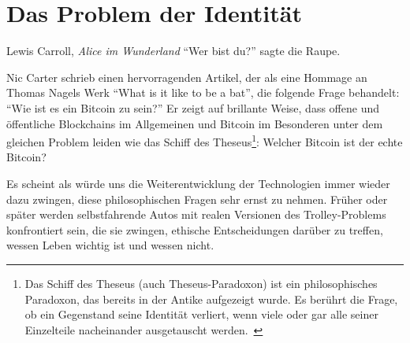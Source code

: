 \chapter{Das Problem der Identität}
\label{les:4}

\begin{chapquote}{Lewis Carroll, \textit{Alice im Wunderland}}
  \enquote{Wer bist du?} sagte die Raupe.
\end{chapquote}

Nic Carter schrieb einen hervorragenden Artikel, der als eine Hommage an Thomas
Nagels Werk \enquote{What is it like to be a bat}, die folgende Frage behandelt:
\enquote{Wie ist es ein Bitcoin zu sein?} Er zeigt auf brillante Weise, dass
offene und öffentliche Blockchains im Allgemeinen und Bitcoin im Besonderen
unter dem gleichen Problem leiden wie das Schiff des Theseus\footnote{ Das
Schiff des Theseus (auch Theseus-Paradoxon) ist ein philosophisches Paradoxon,
das bereits in der Antike aufgezeigt wurde. Es berührt die Frage, ob ein
Gegenstand seine Identität verliert, wenn viele oder gar alle seiner Einzelteile
nacheinander ausgetauscht werden.~\cite{wiki:theseus}}: Welcher Bitcoin ist der
echte Bitcoin?

\begin{quotation}\end{quotation}

Es scheint als würde uns die Weiterentwicklung der Technologien immer wieder
dazu zwingen, diese philosophischen Fragen sehr ernst zu nehmen. Früher oder
später werden selbstfahrende Autos mit realen Versionen des Trolley-Problems
konfrontiert sein, die sie zwingen, ethische Entscheidungen darüber zu treffen,
wessen Leben wichtig ist und wessen nicht.

